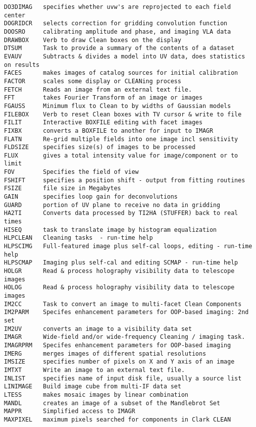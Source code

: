 \begin{verbatim}
DO3DIMAG   specifies whether uvw's are reprojected to each field center
DOGRIDCR   selects correction for gridding convolution function
DOOSRO     calibrating amplitude and phase, and imaging VLA data
DRAWBOX    Verb to draw Clean boxes on the display
DTSUM      Task to provide a summary of the contents of a dataset
EVAUV      Subtracts & divides a model into UV data, does statistics on results
FACES      makes images of catalog sources for initial calibration
FACTOR     scales some display or CLEANing process
FETCH      Reads an image from an external text file.
FFT        takes Fourier Transform of an image or images
FGAUSS     Minimum flux to Clean to by widths of Gaussian models
FILEBOX    Verb to reset Clean boxes with TV cursor & write to file
FILIT      Interactive BOXFILE editing with facet images
FIXBX      converts a BOXFILE to another for input to IMAGR
FLATN      Re-grid multiple fields into one image incl sensitivity
FLDSIZE    specifies size(s) of images to be processed
FLUX       gives a total intensity value for image/component or to limit
FOV        Specifies the field of view
FSHIFT     specifies a position shift - output from fitting routines
FSIZE      file size in Megabytes
GAIN       specifies loop gain for deconvolutions
GUARD      portion of UV plane to receive no data in gridding
HA2TI      Converts data processed by TI2HA (STUFFER) back to real times
HISEQ      task to translate image by histogram equalization
HLPCLEAN   Cleaning tasks  - run-time help
HLPSCIMG   Full-featured image plus self-cal loops, editing - run-time help
HLPSCMAP   Imaging plus self-cal and editing SCMAP - run-time help
HOLGR      Read & process holography visibility data to telescope images
HOLOG      Read & process holography visibility data to telescope images
IM2CC      Task to convert an image to multi-facet Clean Components
IM2PARM    Specifes enhancement parameters for OOP-based imaging: 2nd set
IM2UV      converts an image to a visibility data set
IMAGR      Wide-field and/or wide-frequency Cleaning / imaging task.
IMAGRPRM   Specifes enhancement parameters for OOP-based imaging
IMERG      merges images of different spatial resolutions
IMSIZE     specifies number of pixels on X and Y axis of an image
IMTXT      Write an image to an external text file.
INLIST     specifies name of input disk file, usually a source list
LINIMAGE   Build image cube from multi-IF data set
LTESS      makes mosaic images by linear combination
MANDL      creates an image of a subset of the Mandlebrot Set
MAPPR      Simplified access to IMAGR
MAXPIXEL   maximum pixels searched for components in Clark CLEAN

\end{verbatim}
